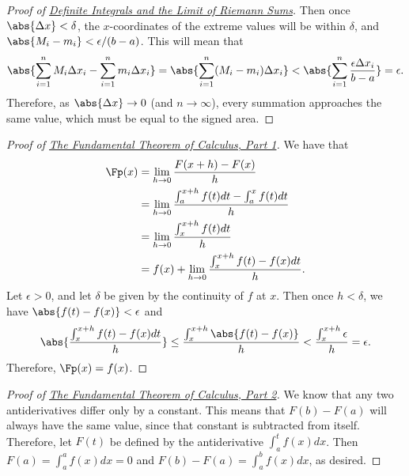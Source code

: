 \begin{proof}[Proof of {\hyperref[thm:riemann_sum]{Definite Integrals and the Limit of Riemann Sums}}]
Then once $\abs{\Delta x}<\delta$, the $x$-coordinates of the extreme values will be within $\delta$, and $\abs{M_i-m_i}<\epsilon/(b-a)$.  This will mean that
\[
 \abs{\sum_{i=1}^n M_i\Delta x_i-\sum_{i=1}^n m_i\Delta x_i}
 =\abs{\sum_{i=1}^n(M_i-m_i)\Delta x_i}
 <\abs{\sum_{i=1}^n\frac{\epsilon\Delta x_i}{b-a}}
 =\epsilon.
\]
Therefore, as $\abs{\Delta x}\to 0$ (and $n\to\infty$), every summation approaches the same value, which must be equal to the signed area.
\end{proof}

\begin{proof}[Proof of {\hyperref[thm:FTC1]{The Fundamental Theorem of Calculus, Part 1}}]
\label{pf:FTC1}
We have that
\begin{align*}
 \Fp(x)
 &= \lim_{h\to 0}\frac{F(x+h)-F(x)}h \\
 &= \lim_{h\to 0}\frac{\int_a^{x+h}f(t)dt-\int_a^x f(t)dt}h \\
 &= \lim_{h\to 0}\frac{\int_x^{x+h}f(t)dt}h \\
 &= f(x)+\lim_{h\to 0}\frac{\int_x^{x+h}f(t)-f(x)dt}h.
\end{align*}
Let $\epsilon>0$, and let $\delta$ be given by the continuity of $f$ at $x$.
Then once $h<\delta$, we have $\abs{f(t)-f(x)}<\epsilon$ and
\[
 \abs{\frac{\int_x^{x+h}f(t)-f(x)dt}h}\le\frac{\int_x^{x+h}\abs{f(t)-f(x)}}h
 <\frac{\int_x^{x+h}\epsilon}h=\epsilon.
\]
Therefore, $\Fp(x)=f(x)$.
\end{proof}

\begin{proof}[Proof of {\hyperref[thm:FTC2]{The Fundamental Theorem of Calculus, Part 2}}]
\label{pf:FTC2}
We know that any two antiderivatives differ only by a constant.  This means that $F(b)-F(a)$ will always have the same value, since that constant is subtracted from itself.  Therefore, let $F(t)$ be defined by the antiderivative $\int_a^t f(x) dx$.  Then $F(a)=\int_a^a f(x) dx=0$ and $F(b)-F(a)=\int_a^b f(x) dx$, as desired.
\end{proof}

